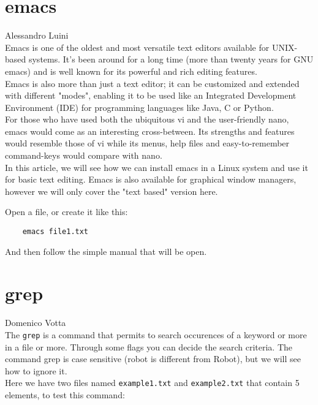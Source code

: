 \documentclass[hidelinks,12pt,a4paper,numbers=enddot]{scrartcl}
\begin{document}
\section{emacs}


\large Alessandro Luini \normalsize\\



Emacs is one of the oldest and most versatile text editors available for
UNIX-based systems. It's been around for a long time (more than twenty years
for GNU emacs) and is well known for its powerful and rich editing features.\\
Emacs is also more than just a text editor; it can be customized and
extended with different "modes", enabling it to be used like an
Integrated Development Environment (IDE) for programming languages
like Java, C or Python.\\

For those who have used both the ubiquitous vi and the user-friendly nano,
emacs would come as an interesting cross-between. Its strengths and features
would resemble those of vi while its menus, help files and easy-to-remember
command-keys would compare with nano.\\

In this article, we will see how we can install emacs
in a Linux system and use it for basic text editing. Emacs
is also available for graphical window managers, however we will only cover the
"text based" version here.

Open a file, or create it like this:

\begin{verbatim}
    emacs file1.txt
\end{verbatim}

And then follow the simple manual that will be open.

\section{grep}


\large Domenico Votta \normalsize\\


The \texttt{grep}  is a command that permits to search occurences of a
keyword or more in a file or more. Through some flags you can decide the search criteria.
The command grep is case sensitive (robot is different from Robot), but we will see how
to ignore it.\\

Here we have two files named \texttt{example1.txt} and
\texttt{example2.txt} that contain 5 elements, to test this command:
\end{document}
